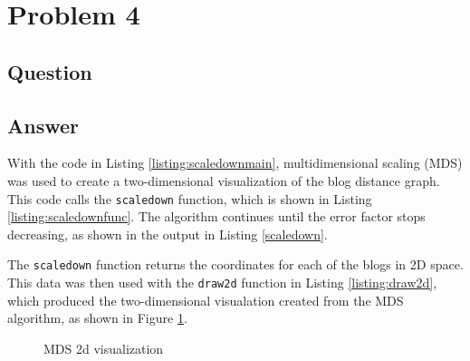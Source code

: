 \section{Problem 4}

\subsection{Question}


\subsection{Answer}

With the code in Listing \ref{listing:scaledownmain}, multidimensional scaling (MDS) was used to create a two-dimensional visualization of the blog distance graph. This code calls the {\tt scaledown} function, which is shown in Listing \ref{listing:scaledownfunc}. The algorithm continues until the error factor stops decreasing, as shown in the output in Listing \ref{scaledown}. 





The {\tt scaledown} function returns the coordinates for each of the blogs in 2D space. This data was then used with the {\tt draw2d} function in Listing \ref{listing:draw2d}, which produced the two-dimensional visualation created from the MDS algorithm, as shown in Figure \ref{fig:blogs2d}.



\begin{figure}[h!]
\centering
{}
\caption{MDS 2d visualization}
\label{fig:blogs2d}
\end{figure}
\clearpage
